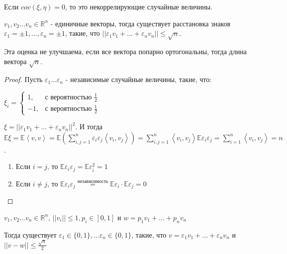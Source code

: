 \begin{definition}
    Если $cov (\xi, \eta) = 0$, то это некоррелирующие случайные величины.
\end{definition}

\begin{theorem}
    
    $v_1, v_2 \ldots v_n \in \mathbb{R}^n$ - единичные векторы, тогда
    существует расстановка знаков $\varepsilon_1 = \pm 1, \ldots, \varepsilon_n = \pm 1$,
    такие, что $||\varepsilon_1 v_1 + \ldots + \varepsilon_nv_n|| \leqslant \sqrt{n}$.

    \begin{remark}
        Эта оценка не улучшаема, если все вектора попарно ортогональны, тогда
        длина вектора $\sqrt{n}$.
    \end{remark}
\end{theorem}

\begin{proof}
    Пусть $\varepsilon_1 \ldots \varepsilon_n$ - независимые случайные величины, такие, что:

    $
    \xi_{i} = 
    \begin{cases}
        1, & \text{с вероятностью $\frac{1}{2}$} \\
        -1, & \text{с вероятностью $\frac{1}{2}$}
    \end{cases}
    $

    $\xi = || \varepsilon_1 v_1 + \ldots + \varepsilon_nv_n ||^2 $. И тогда $\mathbb{E} \xi = \mathbb{E} \left < v, v \right >  = 
    \mathbb{E} (\sum_{i, j = 1}^n \varepsilon_i \varepsilon_j \left < v_i, v_j \right >) = 
    \sum_{i, j = 1}^n \left < v_i, v_j \right > \mathbb{E} \varepsilon_i \varepsilon_j = 
    \sum_{i = 1}^n \left < v_i, v_j \right > = n$.

    \begin{enumerate}
        \item Если $i = j$, то $\mathbb{E} \varepsilon_i \varepsilon_j = \mathbb{E} \varepsilon_i^2 = 1$
        \item Если $i \neq j$, то $\mathbb{E}\varepsilon_i \varepsilon_j \overset{\text{независимость}}{=} \mathbb{E} \varepsilon_i \cdot \mathbb{E} \varepsilon_j = 0$
    \end{enumerate}
\end{proof}

\begin{theorem}
    
    $v_1, v_2 \ldots v_n \in \mathbb{R}^n$, $|| v_i || \leqslant 1, p_i \in [0, 1] $ и 
    $w = p_1v_1 + \ldots + p_n v_n$
    
    Тогда существует $\varepsilon_1 \in \{ 0, 1 \}, \ldots \varepsilon_n \in \{ 0, 1 \}$, 
    такие, что $v = \varepsilon_1v_1 + \ldots + \varepsilon_nv_n$ и $|| v - w || \leqslant \frac{\sqrt{n}}{2}$ 
\end{theorem}
    
